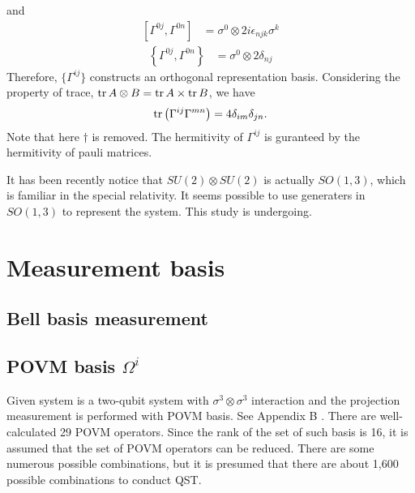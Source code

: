 and
\begin{align}
    \left[ \Gamma^{0j}, \Gamma^{0n} \right] &= \sigma^{0} \otimes 2i \epsilon_{njk} \sigma^{k}
\end{align}
\begin{align}
    \left\{ \Gamma^{0j}, \Gamma^{0n} \right\} &= \sigma^{0} \otimes 2\delta_{nj}
\end{align}
Therefore, $\{\Gamma^{ij} \}$ constructs an orthogonal representation basis. Considering the property of trace, $\trace{A \otimes B} = \trace{A} \times \trace{B}$, we have
\begin{align}
    \trace{\left( { \Gamma^{ij}} \Gamma^{mn} \right)} = 4 \delta_{im}\delta_{jn}. 
    \label{eqn:tracelessProperty}
\end{align}
Note that here $\dagger$ is removed. The hermitivity of ${\Gamma^{ij}}$ is guranteed by the hermitivity of pauli matrices.

It has been recently notice that $SU(2) \otimes SU(2)$ is actually $SO(1,3)$, which is familiar in the special relativity. 
It seems possible to use generaters in $SO(1,3)$ to represent the system. This study is undergoing.

\section{Measurement basis}

\subsection{Bell basis measurement}
\subsection{POVM basis ${\Omega^{i}}$}
Given system is a two-qubit system with $\sigma^{3} \otimes \sigma^{3}$ interaction and the projection measurement is performed with POVM basis. 
See Appendix B .
There are well-calculated 29 POVM operators. Since the rank of the set of such basis is 16, it is assumed that the set of POVM operators can be reduced. 
There are some numerous possible combinations, but it is presumed that there are about 1,600 possible combinations to conduct QST. 

